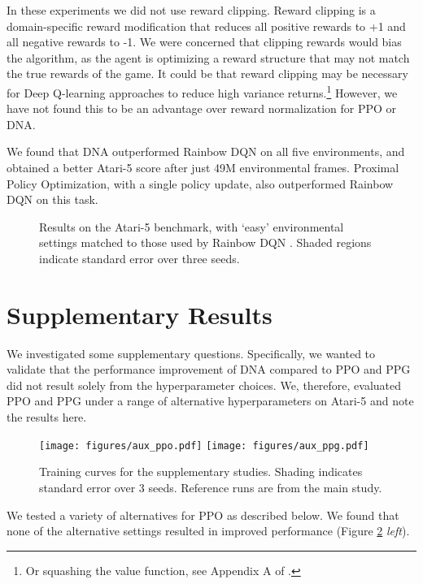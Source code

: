 \documentclass{article}
\begin{document}
In these experiments we did not use reward clipping. Reward clipping is a domain-specific reward modification that reduces all positive rewards to +1 and all negative rewards to -1. We were concerned that clipping rewards would bias the algorithm, as the agent is optimizing a reward structure that may not match the true rewards of the game. It could be that reward clipping may be necessary for Deep Q-learning approaches to reduce high variance returns.\footnote{Or squashing the value function, see Appendix A of \cite{badia2020agent57}.} However, we have not found this to be an advantage over reward normalization for PPO or DNA. 

We found that DNA outperformed Rainbow DQN on all five environments, and obtained a better Atari-5 score after just 49M environmental frames. Proximal Policy Optimization, with a single policy update, also outperformed Rainbow DQN on this task.

\begin{figure}[H]
    \centering
    
    
    \caption{Results on the Atari-5 benchmark, with `easy' environmental settings matched to those used by Rainbow DQN \cite{hessel2018rainbow}. Shaded regions indicate standard error over three seeds.}
    \label{fig:easy_plot}
\end{figure}

\section{Supplementary Results}

We investigated some supplementary questions. Specifically, we wanted to validate that the performance improvement of DNA compared to PPO and PPG did not result solely from the hyperparameter choices. We, therefore, evaluated PPO and PPG under a range of alternative hyperparameters on Atari-5 and note the results here.

\begin{figure}[h]
    \centering
    \texttt{[image: figures/aux\_ppo.pdf]}
    \texttt{[image: figures/aux\_ppg.pdf]}

    \caption{Training curves for the supplementary studies. Shading indicates standard error over 3 seeds. Reference runs are from the main study.}
    \label{fig:aux_results}
\end{figure}

We tested a variety of alternatives for PPO as described below. We found that none of the alternative settings resulted in improved performance (Figure \ref{fig:aux_results} \textit{left}).
\end{document}
